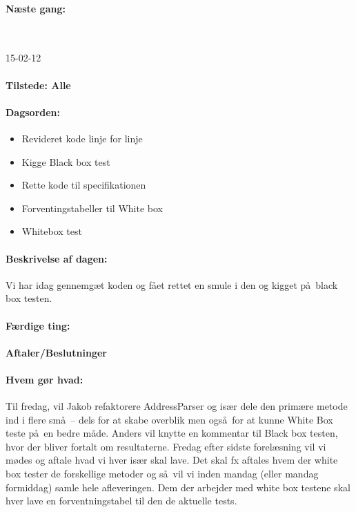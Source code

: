 \documentclass[a4paper,10pt,titlepage]{article}
\begin{document}
			\paragraph{N\ae ste gang:}\mbox{}\\
			
			\begin{center}
		15-02-12
		\end{center}
				\paragraph{Tilstede: Alle}
				\paragraph{Dagsorden:}
				\begin{itemize}
					\item Revideret kode linje for linje
					\item Kigge Black box test
					\item Rette kode til specifikationen
					\item Forventingstabeller til White box
					\item Whitebox test
				\end{itemize}
				
			\paragraph{Beskrivelse af dagen:}
			Vi har idag gennemg\ae t koden og f\aa et rettet en smule i den og kigget p\aa \ black box testen.
			
			\paragraph{F\ae rdige ting:}
			
			\paragraph{Aftaler/Beslutninger}
			
			\paragraph{Hvem g\o r hvad:}
			Til fredag, vil Jakob refaktorere AddressParser og is\ae r dele den prim\ae re metode ind i flere sm\aa \ – dels for at skabe overblik men ogs\aa \ for at kunne White Box teste p\aa \ en bedre m\aa de.
Anders vil knytte en kommentar til Black box testen, hvor der bliver fortalt om resultaterne.
Fredag efter sidste forel\ae sning vil vi m\o des og aftale hvad vi hver is\ae r skal lave. Det skal fx aftales hvem der white box tester de forskellige metoder og s\aa \ vil vi inden mandag (eller mandag formiddag) samle hele afleveringen.
Dem der arbejder med white box testene skal hver lave en forventningstabel til den de aktuelle tests.
\end{document}
